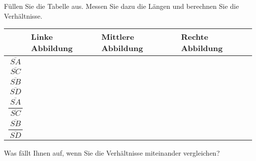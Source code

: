 \documentclass[11pt, a4paper, oneside]{article}
\begin{document}
	Füllen Sie die Tabelle aus.
	Messen Sie dazu die Längen und berechnen Sie die Verhältnisse.
	
	{
	\renewcommand{\arraystretch}{2}
	\setlength\tabcolsep{.5cm}
	\begin{tabularx}{\textwidth}{c|X|X|X}
		& Linke Abbildung & Mittlere Abbildung & Rechte Abbildung\\
		\hline
		$\overline{SA}$ &&&\\
		\hline
		$\overline{SC}$ &&&\\
		\hline
		$\overline{SB}$ &&&\\
		\hline
		$\overline{SD}$ &&&\\
		\hline
		$\dfrac{\ \overline{SA}\ }{\overline{SC}}$ &&&\\
		\hline
		$\dfrac{\ \overline{SB}\ }{\overline{SD}}$ &&&\\
	\end{tabularx}
	}

	Was fällt Ihnen auf, wenn Sie die Verhältnisse miteinander vergleichen?
	
	\lines[3cm]
	
	\pagebreak
	
	\boxarea[22cm]
	
\end{document}
